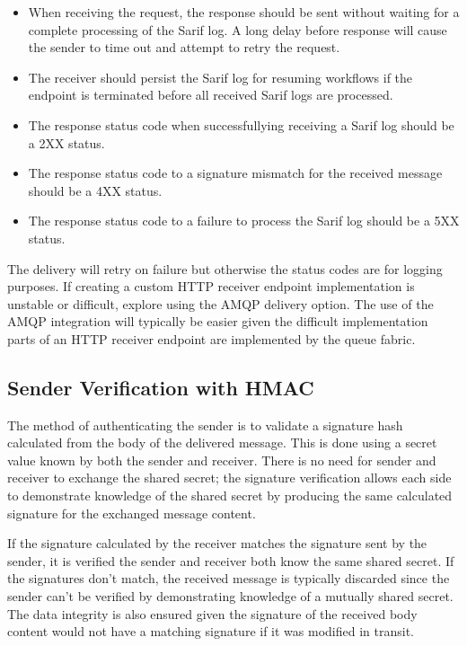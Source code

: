 \begin{itemize}
    \item When receiving the request, the response should be sent without waiting for
    a complete processing of the Sarif log.  A long delay before response will cause the
    sender to time out and attempt to retry the request.
    \item The receiver should persist the Sarif log for resuming workflows if the endpoint is terminated
    before all received Sarif logs are processed.
    \item The response status code when successfullying receiving a Sarif log should be a 2XX status.
    \item The response status code to a signature mismatch for the received message should be a 4XX status.
    \item The response status code to a failure to process the Sarif log should be a 5XX status.
\end{itemize}

The \cxoneflow delivery will retry on failure but otherwise the status codes are for logging purposes. 
If creating a custom HTTP receiver endpoint implementation is unstable or difficult, explore using
the AMQP delivery option.  The use of the AMQP integration will typically be easier given the difficult
implementation parts of an HTTP receiver endpoint are implemented by the queue fabric.

\subsection{Sender Verification with HMAC}
The method of authenticating the sender is to validate a signature hash calculated
from the body of the delivered message.  This is done using a secret value
known by both the sender and receiver.  There is no need for sender and receiver to
exchange the shared secret; the signature verification allows each side to demonstrate
knowledge of the shared secret by producing the same calculated signature for the
exchanged message content.

If the signature calculated by the receiver matches the signature sent
by the sender, it is verified the sender and receiver both know the same
shared secret.  If the signatures don't match, the received message is typically
discarded since the sender can't be verified by demonstrating knowledge of a
mutually shared secret.  The data integrity is also ensured given the signature
of the received body content would not have a matching signature if it was
modified in transit.

